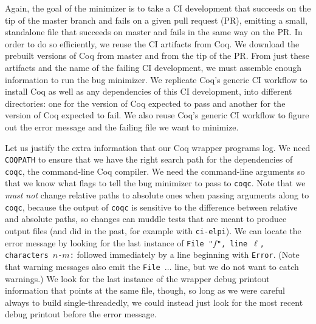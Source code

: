 \documentclass[a4paper,USenglish,cleveref,autoref,thm-restate]{lipics-v2021}
\begin{document}
Again, the goal of the minimizer is to take a CI development that succeeds on the tip of the master branch and fails on a given pull request (PR), emitting a small, standalone file that succeeds on master and fails in the same way on the PR.
In order to do so efficiently, we reuse the CI artifacts from Coq.
We download the prebuilt versions of Coq from master and from the tip of the PR.
From just these artifacts and the name of the failing CI development, we must assemble enough information to run the bug minimizer.
We replicate Coq's generic CI workflow to install Coq as well as any dependencies of this CI development, into different directories: one for the version of Coq expected to pass and another for the version of Coq expected to fail.
We also reuse Coq's generic CI workflow to figure out the error message and the failing file we want to minimize.

Let us justify the extra information that our Coq wrapper programs log.
We need \texttt{COQPATH} to ensure that we have the right search path for the dependencies of \texttt{coqc}, the command-line Coq compiler.
We need the command-line arguments so that we know what flags to tell the bug minimizer to pass to \texttt{coqc}.
Note that we \emph{must not} change relative paths to absolute ones when passing arguments along to \texttt{coqc}, because the output of \texttt{coqc} is sensitive to the difference between relative and absolute paths, so changes can muddle tests that are meant to produce output files (and did in the past, for example with \texttt{ci-elpi}).
We can locate the error message by looking for the last instance of \texttt{File "$f$", line $\ell$, characters $n$-$m$:} followed immediately by a line beginning with \texttt{Error}.
(Note that warning messages also emit the \texttt{File $\ldots$} line, but we do not want to catch warnings.)
We look for the last instance of the wrapper debug printout information that points at the same file, though, so long as we were careful always to build single-threadedly, we could instead just look for the most recent debug printout before the error message.
\end{document}
